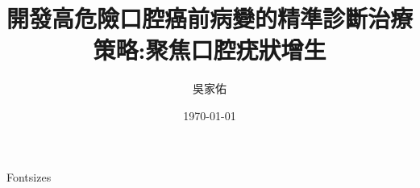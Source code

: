 \documentclass{beamer}
\title{開發高危險口腔癌前病變的精準診斷治療策略:聚焦口腔疣狀增生}
\date[today]{\today}
\author[Name]{吳家佑}
\institute{臺北醫學大學附設醫院口腔顎面外科}
\begin{document}
  \begin{frame}{} 
    \vfill
    \begin{block}{\large Fontsizes}
      \centering
      \LARGE %


\begin{outline}
    


\end{outline}
\end{block}
\end{frame}
\end{document}
